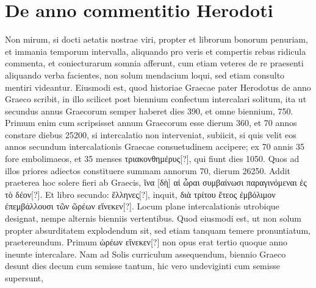 \section{De anno commentitio Herodoti}
Non mirum, si docti aetatis nostrae viri, propter et librorum bonorum
penuriam, et immania temporum intervalla, aliquando
pro veris et compertis rebus ridicula commenta, et coniecturarum
somnia afferunt, cum etiam veteres de re praesenti aliquando
verba facientes, non solum mendacium loqui, sed etiam consulto
mentiri videantur.
Eiusmodi est, quod historiae Graecae pater Herodotus
de anno Graeco scribit, in illo scilicet post biennium confectum intercalari
solitum, ita ut secundus annus Graecorum semper haberet dies
390, et omne biennium, 750.
Primum enim cum scripsisset annum
Graecorum esse dierum 360, et 70 annos constare diebus 25200,
si intercalatio non interveniat, subiicit, si quis velit eos annos secundum
intercalationis Graecae consuetudinem accipere; ex 70 annis 35
fore embolimaeos, et 35 menses \textgreek{τριακονθημέρυς[?]},
 qui fiunt dies 1050.
Quos ad illos priores adiectos constituere summam annorum 70, dierum
26250.
Addit praeterea hoc solere fieri ab Graecis,
 \textgreek{ἵνα [δὴ] αἱ ὧραι συμβαίνωσι
παραγινόμεναι ἐς τὸ δέον[?]}.
Et libro secundo: \textgreek{ἕλληνες[?]},
 inquit, \textgreek{διὰ τρίτου
ἔτεος ἐμβόλιμον ἐπεμβάλλουσι τῶν ῶρέων εἵνεκεν[?]}.
Locum plane intercalationis
utrobique designat, nempe alternis bienniis vertentibus.
Quod
eiusmodi est, ut non solum propter absurditatem explodendum sit, sed
etiam tanquam temere pronuntiatum, praetereundum.
Primum
\textgreek{ὡρέων εἵνεκεν[?]}
 non opus erat tertio quoque anno ineunte intercalare.
Nam ad Solis curriculum assequendum, biennio Graeco desunt dies
decum cum semisse tantum, hic vero undeviginti cum semisse supersunt,
